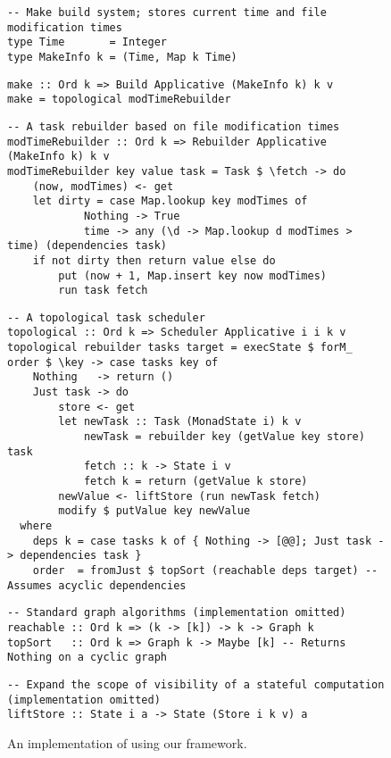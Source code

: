 \begin{figure}
\begin{verbatim}
-- Make build system; stores current time and file modification times
type Time       = Integer
type MakeInfo k = (Time, Map k Time)
\end{verbatim}
\vspace{0mm}
\begin{verbatim}
make :: Ord k => Build Applicative (MakeInfo k) k v
make = topological modTimeRebuilder
\end{verbatim}
\vspace{0mm}
\begin{verbatim}
-- A task rebuilder based on file modification times
modTimeRebuilder :: Ord k => Rebuilder Applicative (MakeInfo k) k v
modTimeRebuilder key value task = Task $ \fetch -> do
    (now, modTimes) <- get
    let dirty = case Map.lookup key modTimes of
            Nothing -> True
            time -> any (\d -> Map.lookup d modTimes > time) (dependencies task)
    if not dirty then return value else do
        put (now + 1, Map.insert key now modTimes)
        run task fetch
\end{verbatim}
\vspace{0mm}
\begin{verbatim}
-- A topological task scheduler
topological :: Ord k => Scheduler Applicative i i k v
topological rebuilder tasks target = execState $ forM_ order $ \key -> case tasks key of
    Nothing   -> return ()
    Just task -> do
        store <- get
        let newTask :: Task (MonadState i) k v
            newTask = rebuilder key (getValue key store) task
            fetch :: k -> State i v
            fetch k = return (getValue k store)
        newValue <- liftStore (run newTask fetch)
        modify $ putValue key newValue
  where
    deps k = case tasks k of { Nothing -> [@@]; Just task -> dependencies task }
    order  = fromJust $ topSort (reachable deps target) -- Assumes acyclic dependencies
\end{verbatim}
\vspace{0mm}
\begin{verbatim}
-- Standard graph algorithms (implementation omitted)
reachable :: Ord k => (k -> [k]) -> k -> Graph k
topSort   :: Ord k => Graph k -> Maybe [k] -- Returns Nothing on a cyclic graph
\end{verbatim}
\vspace{0mm}
\begin{verbatim}
-- Expand the scope of visibility of a stateful computation (implementation omitted)
liftStore :: State i a -> State (Store i k v) a
\end{verbatim}
\vspace{-3mm}
\caption{An implementation of \Make using our framework.}\label{fig-make-implementation}
\vspace{-3mm}
\end{figure}

